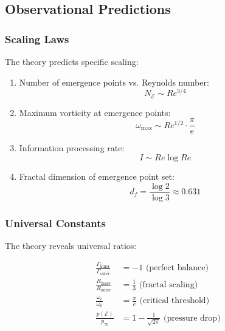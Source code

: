 \documentclass[12pt]{article}
\newcommand{\emergencept}{\mathcal{E}}
\begin{document}
\subsection{Observational Predictions}

\subsubsection{Scaling Laws}

The theory predicts specific scaling:

\begin{enumerate}
\item Number of emergence points vs. Reynolds number:
\begin{equation}
N_{\emergencept} \sim Re^{3/4}
\end{equation}

\item Maximum vorticity at emergence points:
\begin{equation}
\omega_{\max} \sim Re^{1/2} \cdot \frac{\pi}{e}
\end{equation}

\item Information processing rate:
\begin{equation}
I \sim Re \log Re
\end{equation}

\item Fractal dimension of emergence point set:
\begin{equation}
d_f = \frac{\log 2}{\log 3} \approx 0.631
\end{equation}
\end{enumerate}

\subsubsection{Universal Constants}

The theory reveals universal ratios:

\begin{align}
\frac{\Gamma_{\text{inner}}}{\Gamma_{\text{outer}}} &= -1 \text{ (perfect balance)} \\
\frac{R_{\text{inner}}}{R_{\text{outer}}} &= \frac{1}{3} \text{ (fractal scaling)} \\
\frac{\omega_c}{\omega_0} &= \frac{\pi}{e} \text{ (critical threshold)} \\
\frac{p(\emergencept)}{p_\infty} &= 1 - \frac{1}{\sqrt{2\pi}} \text{ (pressure drop)}
\end{align}
\end{document}
